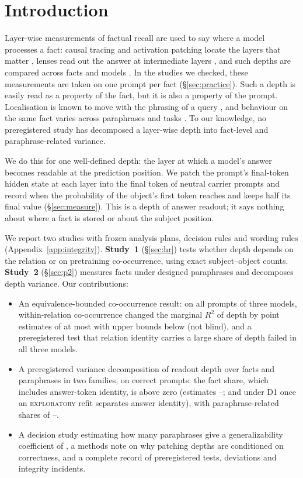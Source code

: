 \documentclass[11pt]{article}
\newcommand{\Rsq}{\ensuremath{R^{2}}\xspace} %
\newcommand{\expl}{\textsc{exploratory}\xspace}
\newcommand{\SOne}{Study~1\xspace} %
\newcommand{\STwo}{Study~2\xspace} %
\begin{document}
\section{Introduction}
Layer-wise measurements of factual recall are used to say where a model processes a fact: causal tracing and activation patching locate the layers that matter \citep{meng2022rome,geva2023dissecting}, lenses read out the answer at intermediate layers \citep{belrose2023tuned,ghandeharioun2024patchscopes}, and such depths are compared across facts and models \citep{gupta2025depth,hochman2026factual}.
In the studies we checked, these measurements are taken on one prompt per fact (\S\ref{sec:practice}).
Such a depth is easily read as a property of the fact, but it is also a property of the prompt.
Localisation is known to move with the phrasing of a query \citep{chen2024knowledge,benz2026knowledgedebugger}, and behaviour on the same fact varies across paraphrases and tasks \citep{elazar2021pararel,elhelo2026task}.
To our knowledge, no preregistered study has decomposed a layer-wise depth into fact-level and paraphrase-related variance.

We do this for one well-defined depth: the layer at which a model's answer becomes readable at the prediction position.
We patch the prompt's final-token hidden state at each layer into the final token of neutral carrier prompts and record when the probability of the object's first token reaches and keeps half its final value (\S\ref{sec:measure}).
This is a depth of answer readout; it says nothing about where a fact is stored or about the subject position.

We report two studies with frozen analysis plans, decision rules and wording rules (Appendix~\ref{app:integrity}).
\textbf{\SOne} (\S\ref{sec:hr}) tests whether depth depends on the relation or on pretraining co-occurrence, using exact subject--object counts.
\textbf{\STwo} (\S\ref{sec:p2}) measures facts under \ptNFrames{} designed paraphrases and decomposes depth variance.
Our contributions:
\begin{itemize}
\item An equivalence-bounded co-occurrence result: on all prompts of three models, within-relation co-occurrence changed the marginal \Rsq of depth by point estimates of at most \hrDRsqMax{} with upper bounds below \hrThrDRsqHi{} (not blind), and a preregistered test that relation identity carries a large share of depth failed in all three models.
\item A preregistered variance decomposition of readout depth over facts and paraphrases in two families, on correct prompts: the fact share, which includes answer-token identity, is above zero (estimates \ptIccRangeLo--\ptIccRangeHi; \explObjFactDOneLlama{} and \explObjFactDOneOlmo{} under D1 once an \expl refit separates answer identity), with paraphrase-related shares of \ptWordingRangeLo--\ptWordingRangeHi.
\item A decision study \citep{brennan2001gtheory} estimating how many paraphrases give a generalizability coefficient of \ptRuleG, a methods note on why patching depths are conditioned on correctness, and a complete record of preregistered tests, deviations and integrity incidents.
\end{itemize}
\end{document}
